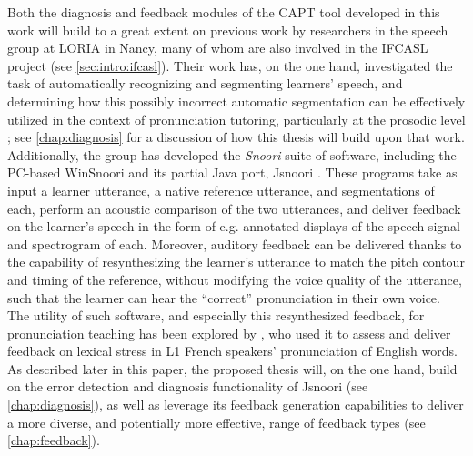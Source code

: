 	Both the diagnosis and feedback modules of the CAPT tool developed in this work will build to a great extent on previous work by researchers in the speech group at LORIA in Nancy, many of whom are also involved in the IFCASL project (see \cref{sec:intro:ifcasl}). Their work has, on the one hand, investigated the task of automatically recognizing and segmenting learners' speech, and determining how this possibly incorrect automatic segmentation can be effectively utilized in the context of pronunciation tutoring, particularly at the prosodic level \citep{Mesbahi2011,Orosanu2012}; see \cref{chap:diagnosis} for a discussion of how this thesis will build upon that work. Additionally, the group has developed the \textit{Snoori} suite of software, including the PC-based WinSnoori and its partial Java port, Jsnoori \citep{Parole2013}.  %
These programs take as input a learner utterance, a native reference utterance, and segmentations of each, perform an acoustic comparison of the two utterances, and deliver feedback on the learner's speech in the form of e.g. annotated displays of the speech signal and spectrogram of each. Moreover, auditory feedback can be delivered thanks to the capability of resynthesizing the learner's utterance to match the pitch contour and timing of the reference, without modifying the voice quality of the utterance, such that the learner can hear the ``correct'' pronunciation in their own voice. The utility of such software, and especially this resynthesized feedback, for pronunciation teaching has been explored by \textcite{Bonneau2011}, who used it to assess and deliver feedback on lexical stress in L1 French speakers' pronunciation of English words. %
As described later in this paper, the proposed thesis will, on the one hand, build on the error detection and diagnosis functionality of Jsnoori (see \cref{chap:diagnosis}), as well as leverage its feedback generation capabilities to deliver a more diverse, and potentially more effective, range of feedback types (see \cref{chap:feedback}). 
	
	
